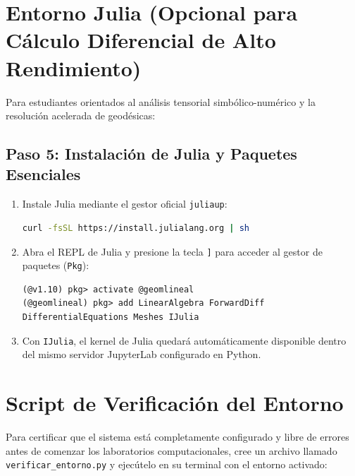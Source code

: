 \documentclass[11pt, a4paper]{article}
\begin{document}
\section{Entorno Julia (Opcional para Cálculo Diferencial de Alto Rendimiento)}

Para estudiantes orientados al análisis tensorial simbólico-numérico y la resolución acelerada de geodésicas:

\subsection{Paso 5: Instalación de Julia y Paquetes Esenciales}
\begin{enumerate}
    \item Instale Julia mediante el gestor oficial \texttt{juliaup}:
\begin{lstlisting}[language=bash]
curl -fsSL https://install.julialang.org | sh
\end{lstlisting}
    \item Abra el REPL de Julia y presione la tecla \texttt{]} para acceder al gestor de paquetes (\texttt{Pkg}):
\begin{lstlisting}
(@v1.10) pkg> activate @geomlineal
(@geomlineal) pkg> add LinearAlgebra ForwardDiff DifferentialEquations Meshes IJulia
\end{lstlisting}
    \item Con \texttt{IJulia}, el kernel de Julia quedará automáticamente disponible dentro del mismo servidor JupyterLab configurado en Python.
\end{enumerate}

\section{Script de Verificación del Entorno}

Para certificar que el sistema está completamente configurado y libre de errores antes de comenzar los laboratorios computacionales, cree un archivo llamado \texttt{verificar\_entorno.py} y ejecútelo en su terminal con el entorno activado:
\end{document}
